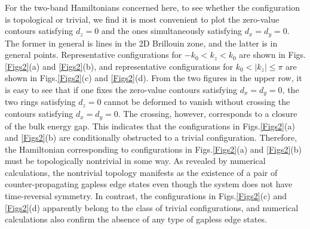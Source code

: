 \documentclass[aps,prl,twocolumn,longbibliography]{revtex4-1}
\begin{document}
\begin{widetext}
For the two-band Hamiltonians concerned here, to see whether the configuration is topological or trivial, we find it is most convenient to plot the zero-value contours satisfying $d_{z}=0$ and the ones simultaneously satisfying $d_{x}=d_{y}=0$. The former in general is lines
in the 2D Brillouin zone, and the latter is in general points. Representative configurations for $-k_{0}<k_{z}<k_{0}$ are
shown in Figs.\ref{Figs2}(a) and \ref{Figs2}(b), and representative configurations for $k_{0}<|k_{z}|\leq\pi$ are shown in Figs.\ref{Figs2}(c) and \ref{Figs2}(d).
From the two figures in the upper row, it is easy to see that if one fixes the zero-value
contours satisfying $d_{x}=d_{y}=0$, the two rings satisfying $d_{z}=0$ cannot be deformed to vanish without crossing
the contours satisfying $d_{x}=d_{y}=0$. The crossing, however, corresponds to a closure of the bulk energy gap. This indicates
that the configurations in Figs.\ref{Figs2}(a) and \ref{Figs2}(b) are conditionally obstructed to a trivial configuration.
Therefore, the Hamiltonian
corresponding to configurations  in Figs.\ref{Figs2}(a) and \ref{Figs2}(b) must  be topologically nontrivial in some way. As revealed by numerical calculations,
the nontrivial topology manifests as the existence of a pair of counter-propagating gapless edge states even though the
system does not have time-reversal symmetry.  In contrast, the configurations
in Figs.\ref{Figs2}(c) and \ref{Figs2}(d) apparently belong to the class of trivial configurations, and numerical calculations also confirm
the absence of any type of gapless edge states.





\end{widetext}
\end{document}
